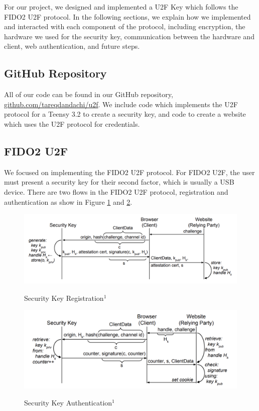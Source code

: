 \documentclass[acmtog,review]{acmart}
\begin{document}
For our project, we designed and implemented a U2F Key which follows the FIDO2 U2F protocol. In the following sections, we explain how we implemented and interacted with each component of the protocol, including encryption, the hardware we used for the security key, communication between the hardware and client, web authentication, and future steps.
 
\subsection{GitHub Repository}
All of our code can be found in our GitHub repository, \\ \hyperlink{https://github.com/tareqdandachi/u2f}{github.com/tareqdandachi/u2f}. We include code which implements the U2F protocol for a Teensy 3.2 to create a security key, and code to create a website which uses the U2F protocol for credentials.

\subsection{FIDO2 U2F}
We focused on implementing the FIDO2 U2F protocol. For FIDO2 U2F, the user must present a security key for their second factor, which is usually a USB device. There are two flows in the FIDO2 U2F protocol, registration and authentication as show in Figure \ref{reg} and \ref{auth}.

\addtocounter{footnote}{1}

\begin{figure}
  \caption{Security Key Registration$^1$}
  \includegraphics[scale=0.35]{register.png}
  \label{reg}
\end{figure}

\begin{figure}
  \caption{Security Key Authentication$^1$}
  \includegraphics[scale=0.35]{authenticate.png}
  \label{auth}
\end{figure}
\end{document}
